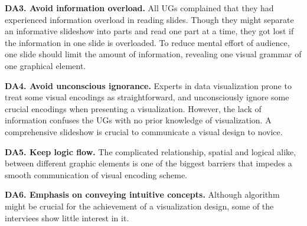 \textbf{DA3. Avoid information overload.} 
All UGs complained that they had experienced information overload in reading slides. Though they might separate an informative slideshow into parts and read one part at a time, they got lost if the information in one slide is overloaded.
To reduce mental effort of audience, one slide should limit the amount of information, revealing one visual grammar of one graphical element. 

\textbf{DA4. Avoid unconscious ignorance.}
Experts in data visualization prone to treat some visual encodings as straightforward, and unconsciously ignore some crucial encodings when presenting a visualization. However, the lack of information confuses the UGs with no prior knowledge of visualization. A comprehensive slideshow is crucial to communicate a visual design to novice.

\textbf{DA5. Keep logic flow.}
The complicated relationship, spatial and logical alike,  between different graphic elements is one of the biggest barriers that impedes a smooth communication of visual encoding scheme. 


\textbf{DA6. Emphasis on conveying intuitive concepts.} 
Although algorithm might be crucial for the achievement of a visualization design, some of the interviees show little interest in it. 
 
